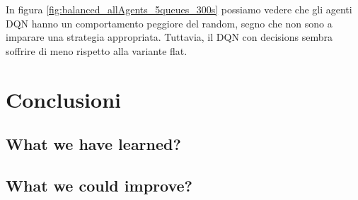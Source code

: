 \documentclass[conference]{IEEEtran}
\begin{document}
In figura \autoref{fig:balanced_allAgents_5queues_300s} possiamo vedere che gli agenti 
DQN hanno un comportamento peggiore del random, segno che non sono a imparare una 
strategia appropriata. Tuttavia, il DQN con decisions sembra soffrire di meno rispetto
alla variante flat.

\section{Conclusioni}

\subsection{What we have learned?}

\subsection{What we could improve?}

\end{document}
